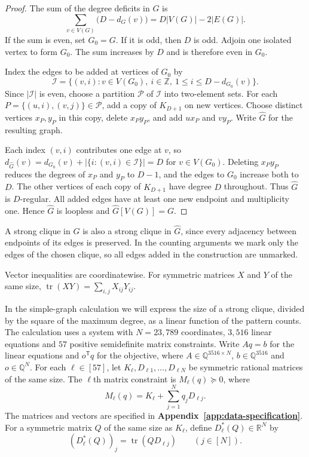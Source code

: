 \documentclass[preprint,11pt,numbers]{elsarticle-arxiv}
\numberwithin{equation}{section}
\theoremstyle{definition}
\DeclareMathOperator{\tr}{tr}
\begin{document}
\begin{proof}
The sum of the degree deficits in $G$ is
\[
 \sum_{v\in V(G)}\bigl(D-d_G(v)\bigr)=D|V(G)|-2|E(G)|.
\]
If the sum is even, set $G_0=G$. If it is odd, then $D$ is odd.
Adjoin one isolated vertex to form $G_0$. The sum increases by $D$
and is therefore even in $G_0$.

Index the edges to be added at vertices of $G_0$ by
\[
 \mathcal I=\bigl\{(v,i):v\in V(G_0),\ i\in\mathbb Z,\
                   1\leq i\leq D-d_{G_0}(v)\bigr\}.
\]
Since $|\mathcal I|$ is even, choose a partition $\mathcal P$ of
$\mathcal I$ into two-element sets. For each
$P=\{(u,i),(v,j)\}\in\mathcal P$, add a copy of $K_{D+1}$ on new
vertices. Choose distinct vertices $x_P,y_P$ in this copy, delete
$x_Py_P$, and add $ux_P$ and $vy_P$. Write $\widehat G$ for the
resulting graph.

Each index $(v,i)$ contributes one edge at $v$, so
$d_{\widehat G}(v)=d_{G_0}(v)+|\{i:(v,i)\in\mathcal I\}|=D$
for $v\in V(G_0)$. Deleting $x_Py_P$ reduces the degrees of
$x_P$ and $y_P$ to $D-1$, and the edges to $G_0$ increase
both to $D$. The other vertices of each copy of $K_{D+1}$
have degree $D$ throughout. Thus $\widehat G$ is $D$-regular.
All added edges have at least one new endpoint and multiplicity
one. Hence $\widehat G$ is loopless and $\widehat G[V(G)]=G$.
\end{proof}

A strong clique in $G$ is also a strong clique in $\widehat G$, since
every adjacency between endpoints of its edges is preserved. In the
counting arguments we mark only the edges of the chosen clique, so
all edges added in the construction are unmarked.

Vector inequalities are coordinatewise. For symmetric matrices $X$
and $Y$ of the same size, $\tr(XY)=\sum_{i,j}X_{ij}Y_{ij}$.

In the simple-graph calculation we will express the size of a strong
clique, divided by the square of the maximum degree, as a linear
function of the pattern counts. The calculation uses a system with $N=23{,}789$ coordinates, $3{,}516$ linear equations and
$57$ positive semidefinite matrix constraints. Write $Aq=b$ for the
linear equations and $o^{\mathsf T}q$ for the objective, where
$A\in\mathbb Q^{3516\times N}$, $b\in\mathbb Q^{3516}$ and
$o\in\mathbb Q^N$. For each $\ell\in[57]$, let
$K_\ell,D_{\ell1},\ldots,D_{\ell N}$ be symmetric rational matrices of
the same size. The $\ell$th matrix constraint is $M_\ell(q)\succeq0$,
where
\begin{equation}\label{eq:intro-affine-gram}
 M_\ell(q)=K_\ell+\sum_{j=1}^N q_jD_{\ell j}.
\end{equation}
The matrices and vectors are specified in \textbf{Appendix~\ref{app:data-specification}}.
For a symmetric matrix
$Q$ of the same size as $K_\ell$, define
$D_\ell^*(Q)\in\mathbb R^N$ by
\begin{equation}\label{eq:intro-trace-adjoint}
 (D_\ell^*(Q))_j=\tr(QD_{\ell j})\qquad(j\in[N]).
\end{equation}
\end{document}
